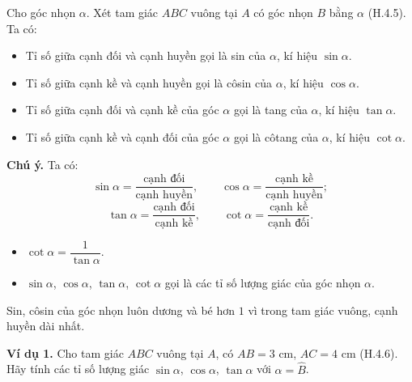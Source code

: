 \begin{lesson}
    Cho góc nhọn $\alpha$. Xét tam giác $ABC$ vuông tại $A$ có góc nhọn $B$ bằng $\alpha$ (H.4.5). Ta có:
    \begin{itemize}
        \item Tỉ số giữa cạnh đối và cạnh huyền gọi là sin của $\alpha$, kí hiệu $\sin\alpha$.
        \item Tỉ số giữa cạnh kề và cạnh huyền gọi là côsin của $\alpha$, kí hiệu $\cos\alpha$.
        \item Tỉ số giữa cạnh đối và cạnh kề của góc $\alpha$ gọi là tang của $\alpha$, kí hiệu $\tan\alpha$.
        \item Tỉ số giữa cạnh kề và cạnh đối của góc $\alpha$ gọi là côtang của $\alpha$, kí hiệu $\cot\alpha$.
    \end{itemize}

    \begin{center}
    \end{center}

    \textbf{Chú ý.} Ta có:
    \[
        \sin\alpha=\dfrac{\text{cạnh đối}}{\text{cạnh huyền}},\qquad
        \cos\alpha=\dfrac{\text{cạnh kề}}{\text{cạnh huyền}};
    \]
    \[
        \tan\alpha=\dfrac{\text{cạnh đối}}{\text{cạnh kề}},\qquad
        \cot\alpha=\dfrac{\text{cạnh kề}}{\text{cạnh đối}}.
    \]
    \begin{itemize}
        \item $\cot\alpha=\dfrac{1}{\tan\alpha}$.
        \item $\sin\alpha$, $\cos\alpha$, $\tan\alpha$, $\cot\alpha$ gọi là các tỉ số lượng giác của góc nhọn $\alpha$.
    \end{itemize}

    Sin, côsin của góc nhọn luôn dương và bé hơn $1$ vì trong tam giác vuông, cạnh huyền dài nhất.

    \textbf{Ví dụ 1.} Cho tam giác $ABC$ vuông tại $A$, có $AB=3$ cm, $AC=4$ cm (H.4.6). Hãy tính các tỉ số lượng giác $\sin\alpha$, $\cos\alpha$, $\tan\alpha$ với $\alpha=\widehat B$.


\end{lesson}
